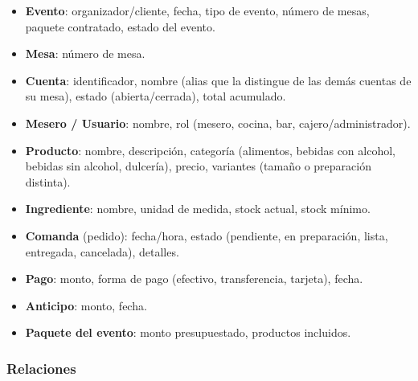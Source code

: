 \begin{itemize}
    \item \textbf{Evento}: organizador/cliente, fecha, tipo de evento, número de mesas, paquete contratado, estado del evento.
    \item \textbf{Mesa}: número de mesa.
    \item \textbf{Cuenta}: identificador, nombre (alias que la distingue de las demás cuentas de su mesa), estado (abierta/cerrada), total acumulado.
    \item \textbf{Mesero / Usuario}: nombre, rol (mesero, cocina, bar, cajero/administrador).
    \item \textbf{Producto}: nombre, descripción, categoría (alimentos, bebidas con alcohol, bebidas sin alcohol, dulcería), precio, variantes (tamaño o preparación distinta).
    \item \textbf{Ingrediente}: nombre, unidad de medida, stock actual, stock mínimo.
    \item \textbf{Comanda} (pedido): fecha/hora, estado (pendiente, en preparación, lista, entregada, cancelada), detalles.
    \item \textbf{Pago}: monto, forma de pago (efectivo, transferencia, tarjeta), fecha.
    \item \textbf{Anticipo}: monto, fecha.
    \item \textbf{Paquete del evento}: monto presupuestado, productos incluidos.
\end{itemize}

\subsubsection{Relaciones}

